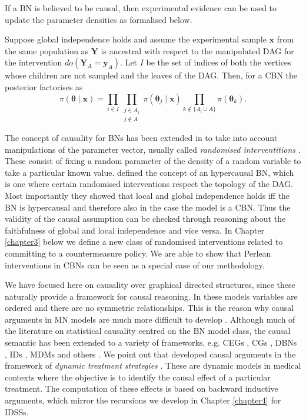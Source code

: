 If a BN is believed to be causal, then experimental evidence can be used to update the parameter densities as formalised below.

\begin{proposition}
 Suppose global independence holds and assume the experimental sample $\bm{x}$ from the same population as $\bm{Y}$ is ancestral with respect to the manipulated DAG for the intervention $do(\bm{Y}_A=\bm{y}_A)$. Let $I$ be the set of indices of both the vertices whose children are not sampled and the leaves of the DAG. Then, for a CBN the posterior factorises as
 \begin{equation*}
 \pi(\bm{\theta}\;|\;\bm{x})=\prod_{i\in I}\prod_{\substack{j\in A_i\\j\not\in A}}\pi(\bm{\theta}_j\;|\;\bm{x})\prod_{k\not\in \{A_i\cup A\}}\pi(\bm{\theta}_k).
 \end{equation*}
\end{proposition}

The concept of causality for BNs has been extended in \citet{Daneshkhah2004} to take into account manipulations of the parameter vector, usually called \textit{randomised interventitions} \citep[see e.g.][]{Lauritzen2001, Daneshkhah2004}.  These consist of fixing a random parameter of the density of a random variable to take a particular known value.   \citet{Daneshkhah2004} defined the concept of an hypercausal BN, which is one where certain randomised interventions respect the topology of the DAG. Most importantly they showed that local and global independence holds iff the BN is hypercausal and therefore also in the case the model is a CBN. Thus the validity of the causal assumption can be checked through reasoning about the faithfulness of global and local independence and vice versa. In Chapter \ref{chapter3} below we define a new class of randomised interventions related to committing to a countermeasure policy. We are able to show that Perlean interventions in CBNs can be seen as a special case of our methodology.  
 
We have focused here on causality over graphical directed structures, since these naturally provide a framework for causal reasoning. In these models variables are ordered and there are no symmetric relationships. This is the reason why causal arguments in MN models are much more difficult to develop \citep[see e.g.][]{Lauritzen2002}. Although much of the literature on statistical causality centred on the BN model class, the causal semantic has been extended to a variety of frameworks, e.g. CEGs \citep{Thwaites2010,Thwaites2013}, CGs \citep{Lauritzen2002}, DBNs \citep{Eichler2007}, IDs \citep{Dawid2002a}, MDMs \citep{Queen2009} and  others \citep{Aalen2012, Dawid2010, Smith2007}.  We point out that \citet{Dawid2010} developed causal arguments in the framework of \textit{dynamic treatment strategies} \citep{Murphy2003}. These are dynamic models in medical contexts where the objective is to identify the causal effect of a particular treatment. The computation of these effects is based on backward inductive arguments, which mirror the recursions we develop in Chapter \ref{chapter4} for IDSSs. 
 
